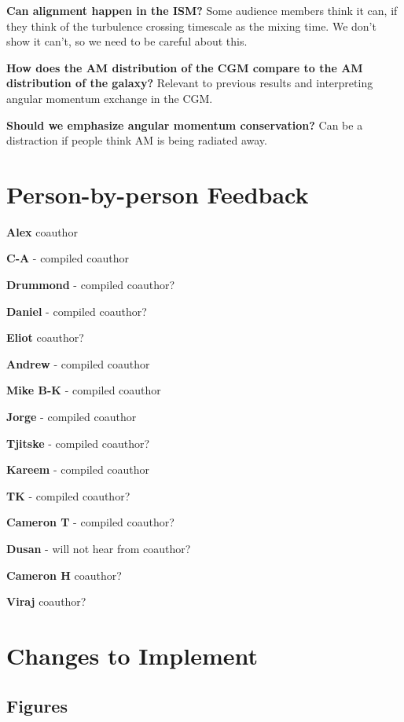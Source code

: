 \textbf{Can alignment happen in the ISM?}
Some audience members think it can, if they think of the turbulence crossing timescale as the mixing time.
We don't show it can't, so we need to be careful about this.

\textbf{How does the AM distribution of the CGM compare to the AM distribution of the galaxy?}
Relevant to previous results and interpreting angular momentum exchange in the CGM.

\textbf{Should we emphasize angular momentum conservation?}
Can be a distraction if people think AM is being radiated away.

\section{Person-by-person Feedback}


\textbf{Alex}
coauthor

\textbf{C-A} - compiled
coauthor

\textbf{Drummond} - compiled
coauthor?

\textbf{Daniel} - compiled
coauthor?

\textbf{Eliot}
coauthor?

\textbf{Andrew} - compiled
coauthor

\textbf{Mike B-K} - compiled
coauthor

\textbf{Jorge} - compiled
coauthor

\textbf{Tjitske} - compiled
coauthor?

\textbf{Kareem} - compiled
coauthor

\textbf{TK} - compiled
coauthor?

\textbf{Cameron T} - compiled
coauthor?

\textbf{Dusan} - will not hear from
coauthor?

\textbf{Cameron H}
coauthor?

\textbf{Viraj}
coauthor?

\section{Changes to Implement}

\subsection{Figures}



